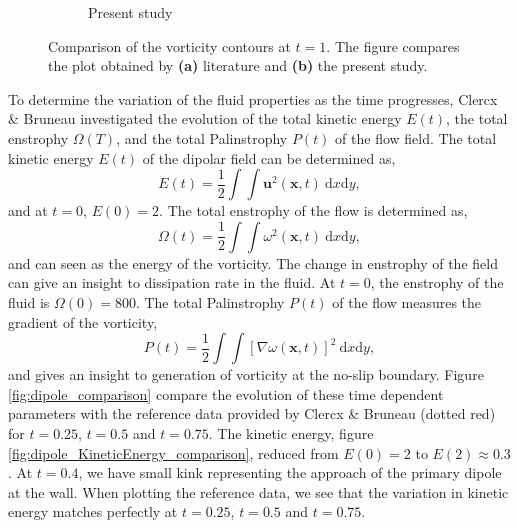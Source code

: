 \begin{figure}[p]
\begin{subfigure}[t]{0.5\textwidth}
             \caption{Present study}
             \label{fig:dipole_contourLine_t1p0}
     \end{subfigure}
     \caption{Comparison of the vorticity contours at $t=1$. The figure compares the plot obtained by \textbf{(a)} literature and \textbf{(b)} the present study.}
     \label{fig:vorticity_contour_comparison}
	\end{figure}	
	
To determine the variation of the fluid properties as the time progresses, Clercx \& Bruneau investigated the evolution of the total kinetic energy $E(t)$, the total enstrophy $\Omega(T)$, and the total Palinstrophy $P(t)$ of the flow field. The total kinetic energy $E(t)$ of the dipolar field can be determined as,
	\begin{equation}
	E(t) = \frac{1}{2} \int\int \mathbf{u}^2(\mathbf{x},t)\ \mathrm{d}x\mathrm{d}y,
	\end{equation}
and at $t=0$, $E(0) = 2$. The total enstrophy of the flow is determined as, 
	\begin{equation}
	\Omega(t) = \frac{1}{2}\int\int\omega^2(\mathbf{x},t)\ \mathrm{d}x\mathrm{d}y,
	\end{equation}	
and can seen as the energy of the vorticity. The change in enstrophy of the field can give an insight to dissipation rate in the fluid. At $t=0$, the enstrophy of the fluid is $\Omega(0)=800$. The total Palinstrophy $P(t)$ of the flow measures the gradient of the vorticity, 
	\begin{equation}
	P(t) = \frac{1}{2}\int\int\left[\nabla\omega(\mathbf{x},t)\right]^2\ \mathrm{d}x\mathrm{d}y,
	\end{equation}
and gives an insight to generation of vorticity at the no-slip boundary. Figure \ref{fig:dipole_comparison} compare the evolution of these time dependent parameters with the reference data provided by Clercx \& Bruneau (dotted red) for $t=0.25$, $t=0.5$ and $t=0.75$. The kinetic energy, figure \ref{fig:dipole_KineticEnergy_comparison}, reduced from $E(0) = 2$ to $E(2) \approx 0.3$. At $t=0.4$, we have small kink representing the approach of the primary dipole at the wall. When plotting the reference data, we see that the variation in kinetic energy matches perfectly at $t=0.25$, $t=0.5$ and $t=0.75$.
	

